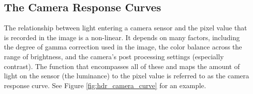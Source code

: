



\subsection{The Camera Response Curves}
The relationship between light entering a camera sensor and the pixel
value that is recorded in the image is a non-linear.  It depends on
many factors, including the degree of gamma correction used in the
image, the color balance across the range of brightness, and the
camera's post processing settings (especially contrast).  The function
that encompasses all of these and maps the amount of light on the
sensor (the luminance) to the pixel value is referred to as the camera
response curve.  See Figure \ref{fig:hdr_camera_curve} for an example.

